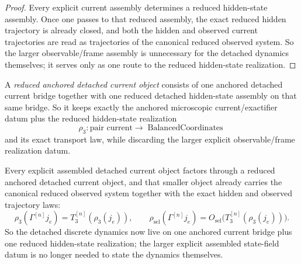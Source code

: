 \begin{proof}
Every explicit current assembly determines a reduced hidden-state assembly.
Once one passes to that reduced assembly, the exact reduced hidden trajectory
is already closed, and both the hidden and observed current trajectories are
read as trajectories of the canonical reduced observed system. So the larger
observable/frame assembly is unnecessary for the detached dynamics themselves; it
serves only as one route to the reduced hidden-state realization.
\end{proof}

\begin{definition}
\label{def:reduced-anchored-detached-current-object}
A \emph{reduced anchored detached current object} consists of one anchored
detached current bridge together with one reduced detached hidden-state
assembly on that same bridge. So it keeps exactly the anchored microscopic
current/exactifier datum plus the reduced hidden-state realization
\[
\rho_3 : \text{pair current}\to \operatorname{BalancedCoordinates}
\]
and its exact transport law, while discarding the larger explicit
observable/frame realization datum.
\end{definition}

\begin{corollary}
\label{thm:the-reduced-anchored-detached-current-object-already-carries-the-canonical-reduced-observed-system}
Every explicit assembled detached current object factors through a reduced
anchored detached current object, and that smaller object already carries the
canonical reduced observed system together with the exact hidden and observed
trajectory laws:
\[
\rho_3(\Gamma^{[n]} j_e)=T_3^{[n]}(\rho_3(j_e)),
\qquad
\rho_{\mathrm{sel}}(\Gamma^{[n]} j_e)=
O_{\mathrm{sel}}\!\bigl(T_3^{[n]}(\rho_3(j_e))\bigr).
\]
So the detached discrete dynamics now live on one anchored current bridge plus
one reduced hidden-state realization; the larger explicit assembled state-field
datum is no longer needed to state the dynamics themselves.
\end{corollary}

